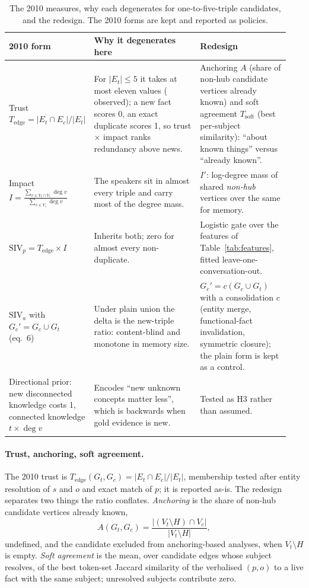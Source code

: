 \documentclass{ceurart}
\newcommand{\Gc}{G_c}
\newcommand{\Gt}{G_t}
\newcommand{\Gcp}{G_c'}
\newcommand{\Ec}{E_c}
\newcommand{\Et}{E_t}
\newcommand{\Vc}{V_c}
\newcommand{\Vt}{V_t}
\newcommand{\Hub}{H}
\newcommand{\Tedge}{T_{\mathrm{edge}}}
\newcommand{\Tsoft}{T_{\mathrm{soft}}}
\newcommand{\Anc}{A}
\newcommand{\Imp}{I}
\newcommand{\Implog}{I'}
\newcommand{\SIVp}{\mathrm{SIV}_p}
\newcommand{\SIVa}{\mathrm{SIV}_a}
\newcommand{\degv}{\deg}
\newcommand{\cons}{c}
\begin{document}
\begin{table}[tp]
  \centering
  \caption{The 2010 measures, why each degenerates for one-to-five-triple candidates, and the redesign. The 2010 forms are kept and reported as policies.}
  \label{tab:measures}
  \small
  \begin{tabular}{@{}p{0.24\linewidth}p{0.38\linewidth}p{0.32\linewidth}@{}}
    \toprule
    2010 form & Why it degenerates here & Redesign \\
    \midrule
    Trust $\Tedge=|\Et\cap\Ec|/|\Et|$ & For $|\Et|\le 5$ it takes at most eleven values (\nDistinctTedge{} observed); a new fact scores 0, an exact duplicate scores 1, so trust $\times$ impact ranks redundancy above news. & Anchoring $\Anc$ (share of non-hub candidate vertices already known) and soft agreement $\Tsoft$ (best per-subject similarity): ``about known things'' versus ``already known''. \\
    \addlinespace
    Impact $\Imp=\frac{\sum_{v\in\Vt\cap\Vc}\degv v}{\sum_{v\in\Vc}\degv v}$ & The speakers sit in almost every triple and carry most of the degree mass. & $\Implog$: log-degree mass of shared \emph{non-hub} vertices over the same for memory. \\
    \addlinespace
    $\SIVp=\Tedge\times\Imp$ & Inherits both; zero for almost every non-duplicate. & Logistic gate over the features of Table~\ref{tab:features}, fitted leave-one-conversation-out. \\
    \addlinespace
    $\SIVa$ with $\Gcp=\Gc\cup\Gt$ (eq.~6) & Under plain union the delta is the new-triple ratio: content-blind and monotone in memory size. & $\Gcp=\cons(\Gc\cup\Gt)$ with a consolidation $\cons$ (entity merge, functional-fact invalidation, symmetric closure); the plain form is kept as a control. \\
    \addlinespace
    Directional prior: new disconnected knowledge costs 1, connected knowledge $t\times\degv v$ & Encodes ``new unknown concepts matter less'', which is backwards when gold evidence is new. & Tested as H3 rather than assumed. \\
    \bottomrule
  \end{tabular}
\end{table}

\paragraph{Trust, anchoring, soft agreement.} The 2010 trust is $\Tedge(\Gt,\Gc)=|\Et\cap\Ec|/|\Et|$, membership tested after entity resolution of $s$ and $o$ and exact match of $p$; it is reported as-is. The redesign separates two things the ratio conflates. \emph{Anchoring} is the share of non-hub candidate vertices already known,
\begin{equation}
  \Anc(\Gt,\Gc)=\frac{|(\Vt\setminus\Hub)\cap\Vc|}{|\Vt\setminus\Hub|},
  \label{eq:anchoring}
\end{equation}
undefined, and the candidate excluded from anchoring-based analyses, when $\Vt\setminus\Hub$ is empty. \emph{Soft agreement} is the mean, over candidate edges whose subject resolves, of the best token-set Jaccard similarity of the verbalised $(p,o)$ to a live fact with the same subject; unresolved subjects contribute zero.
\end{document}
